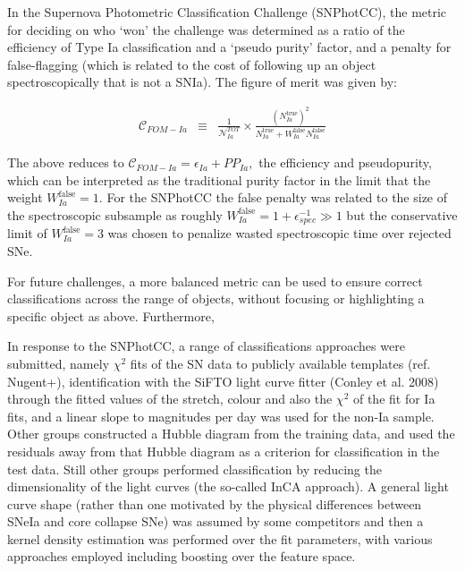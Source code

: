 In the Supernova Photometric Classification Challenge (SNPhotCC), the metric for deciding on who `won' the challenge was determined as a ratio of the efficiency of Type Ia classification and a `pseudo purity' factor, and a penalty for false-flagging (which is related to the cost of following up an object spectroscopically that is not a SNIa).
The figure of merit was given by:

\begin{eqnarray}
\mathcal{C}_{FOM-Ia} &\equiv& \frac{1}{\mathcal{N}_{Ia}^{TOT}}\times \frac{(N_{Ia}^{\mathrm{true}})^2}{N_{Ia}^\mathrm{true}+W_{Ia}^\mathrm{false}N_{Ia}^\mathrm{false}}
\end{eqnarray}

The above reduces to $\mathcal{C}_{FOM-Ia}  = \epsilon_{Ia} + PP_{Ia},$ the efficiency and pseudopurity, which can be interpreted as the traditional purity factor in the limit that the weight $W_{Ia}^\mathrm{false} = 1$.
For the SNPhotCC the false penalty was related to the size of the spectroscopic subsample as roughly $W_{Ia}^\mathrm{false} = 1 + \epsilon_{spec}^{-1} \gg 1$ but the conservative limit of $W_{Ia}^\mathrm{false} = 3$ was chosen to penalize wasted spectroscopic time over rejected SNe.

For future challenges, a more balanced metric can be used to ensure correct classifications across the range of objects, without focusing or highlighting a specific object as above.
Furthermore,

In response to the SNPhotCC, a range of classifications approaches were submitted, namely $\chi^{2}$ fits of the SN data to publicly available templates (ref. Nugent+), identification with the SiFTO light curve fitter (Conley et al. 2008) through the fitted values of the stretch, colour and also the $\chi^{2}$ of the fit for Ia fits, and a linear slope to magnitudes per day was used for the non-Ia sample.
Other groups constructed a Hubble diagram from the training data, and used the residuals away from that Hubble diagram as a criterion for classification in the test data.
Still other groups performed classification by reducing the dimensionality of the light curves (the so-called InCA approach).
A general light curve shape (rather than one motivated by the physical differences between SNeIa and core collapse SNe) was assumed by some competitors and then a kernel density estimation was performed over the fit parameters, with various approaches employed including boosting over the feature space.

